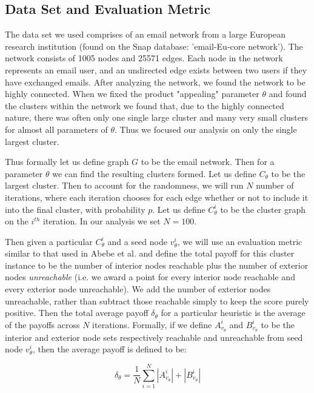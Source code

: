 \documentclass{article}
\begin{document}
\subsection{Data Set and Evaluation Metric}

The data set we used comprises of an email network from a large European research institution (found on the Snap database: 'email-Eu-core network'). The network consists of 1005 nodes and 25571 edges. Each node in the network represents an email user, and an undirected edge exists between two users if they have exchanged emails. After analyzing the network, we found the network to be highly connected. When we fixed the product "appealing" parameter $\theta$ and found the clusters within the network we found that, due to the highly connected nature, there was often only one single large cluster and many very small clusters for almost all parameters of $\theta$.  Thus we focused our analysis on only the single largest cluster. 

Thus formally let us define graph $G$ to be the email network. Then for a parameter $\theta$ we can find the resulting clusters formed. Let us define $C_{\theta}$ to be the largest cluster. Then to account for the randomness, we will run $N$ number of iterations, where each iteration chooses for each edge whether or not to include it into the final cluster, with probability $p$. Let us define $C_{\theta}^i$ to be the cluster graph on the $i^{th}$ iteration. In our analysis we set $N=100$. 

Then given a particular $C_{\theta}^i$ and a seed node $v_{\theta}^i$, we will use an evaluation metric similar to that used in Abebe et al. and define the total payoff for this cluster instance to be the number of interior nodes reachable plus the number of exterior nodes \textit{unreachable} (i.e. we award a point for every interior node reachable and every exterior node unreachable). We add the number of exterior nodes unreachable, rather than subtract those reachable simply to keep the score purely positive. Then the total average payoff $\delta_{\theta}$ for a particular heuristic is the average of the payoffs across $N$ iterations. Formally, if we define $A_{v_\theta}^i$ and $B_{v_\theta}^i$ to be the interior and exterior node sets respectively reachable and unreachable from seed node $v_{\theta}^i$, then the average payoff is defined to be:

\begin{equation}
\delta_{\theta} =\frac{1}{N} \sum_{i=1}^{N} |A_{v_\theta}^i| + |B_{v_\theta}^i| 
\end{equation}
\end{document}
